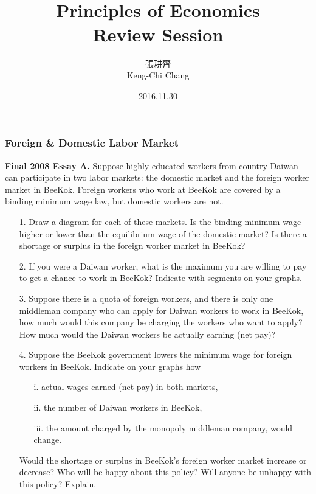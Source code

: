 \documentclass[12pt, xcolor=dvipsnames]{beamer}
\title{\bf{\Huge {}\\[-2mm] Principles of Economics \\[2mm] Review Session}}
\author{{\Large 張耕齊\\[2mm] Keng-Chi Chang}}
\institute{{}\\[-7mm]\footnotesize\tt{<r03323070@ntu.edu.tw>}\\[2mm]}
\date{\large 2016.11.30}
\begin{document}
\fontsize{12}{14pt}\selectfont

\begin{frame}
\titlepage
\end{frame}



\begin{frame}
\frametitle{\bf Foreign \& Domestic Labor Market}
\small \textsf{\bfseries Final 2008 Essay A.} 
Suppose highly educated workers from country Daiwan can participate in two labor markets:
the domestic market and the foreign worker market in BeeKok. Foreign workers who work
at BeeKok are covered by a binding minimum wage law, but domestic workers are not.
\begin{enumerate}\itemsep-0.5ex
\item[1.] Draw a diagram for each of these markets. Is the binding minimum wage higher or lower than the equilibrium wage of the domestic market? Is there a shortage or surplus in the foreign worker market in BeeKok?
\item[2.] If you were a Daiwan worker, what is the maximum you are willing to pay to get a chance to work in BeeKok? Indicate with segments on your graphs.
\end{enumerate}
\end{frame}

\begin{frame}
\small 
\begin{enumerate}\itemsep-0.5ex 
\item[3.] Suppose there is a quota of foreign workers, and there is only one middleman company who can apply for Daiwan workers to work in BeeKok, how much would this company be charging the workers who want to apply? How much would the Daiwan workers be actually earning (net pay)?
\item[4.] Suppose the BeeKok government lowers the minimum wage for foreign workers in BeeKok. Indicate on your graphs how
\begin{enumerate}\itemsep-0.5ex 
\item[i.] actual wages earned (net pay) in both markets,
\item[ii.] the number of Daiwan workers in BeeKok,
\item[iii.] the amount charged by the monopoly middleman company, would change.
\end{enumerate}
Would the shortage or surplus in BeeKok's foreign worker market increase or decrease? Who will be happy about this policy? Will anyone be unhappy with this policy? Explain.
\end{enumerate}
\end{frame}
\end{document}
